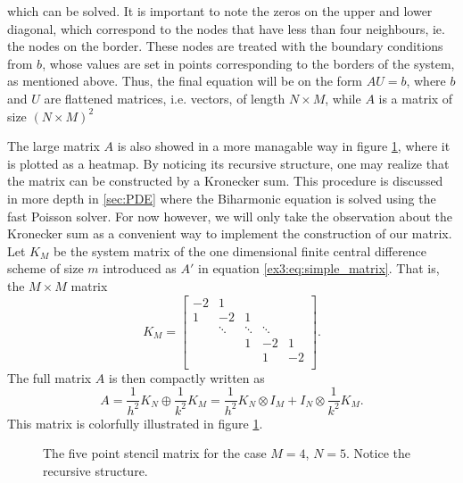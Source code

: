 which can be solved.
It is important to note the zeros on the upper and lower diagonal, which correspond to the nodes that have less than four neighbours, ie. the nodes on the border.
These nodes are treated with the boundary conditions from $b$, whose values are set in points corresponding to the borders of the system, as mentioned above.
Thus, the final equation will be on the form $AU = b$, where $b$ and $U$ are flattened matrices, i.e. vectors, of length $N \times M$, while $A$ is a matrix of size $(N \times M)^2$

The large matrix $A$ is also showed in a more managable way in figure \ref{fig:laplace:stencil}, where it is plotted as a heatmap.
By noticing its recursive structure, one may realize that the matrix can be constructed by a Kronecker sum.
This procedure is discussed in more depth in \ref{sec:PDE} where the Biharmonic equation is solved using the fast Poisson solver.
For now however, we will only take the observation about the Kronecker sum as a convenient way to implement the construction of our matrix.
Let $K_M$ be the system matrix of the one dimensional finite central difference scheme of size $m$ introduced as $A'$ in equation \eqref{ex3:eq:simple_matrix}.
That is, the $M\times M$ matrix
$$
K_M =
\begin{bmatrix}
  -2& 1 \\
  1 & -2 & 1 &   \\
  & \ddots & \ddots & \ddots & \\
  &   & 1 & -2 & 1 \\
  &   &  & 1 & -2 \\
\end{bmatrix}.
$$
The full matrix $A$ is then compactly written as
\begin{equation}
  A =
  \frac{1}{h^2} K_N \oplus \frac{1}{k^2} K_M
  = \frac{1}{h^2} K_N \otimes I_M
  + I_N \otimes \frac{1}{k^2} K_M.
\end{equation}
This matrix is colorfully illustrated in figure \ref{fig:laplace:stencil}.

\begin{figure}[ht]
  \centering

  \caption{The five point stencil matrix for the case $M=4$, $N=5$. Notice the recursive structure.}
  \label{fig:laplace:stencil}
\end{figure}

